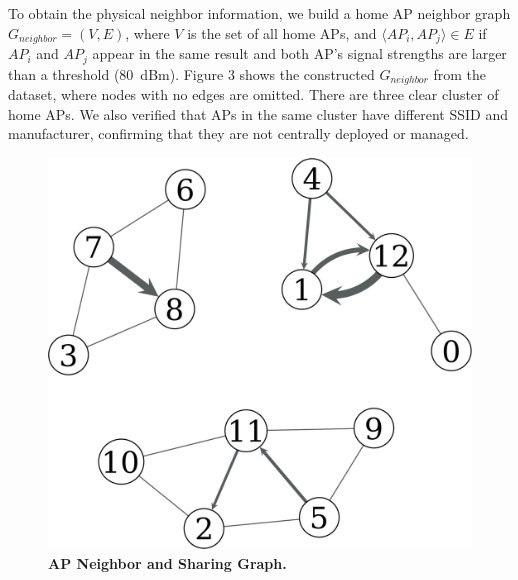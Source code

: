 To obtain the physical neighbor information, we build a home AP neighbor graph
$G_{neighbor}=(V, E)$, where $V$ is the set of all home APs, and $\langle AP_i,
AP_j \rangle \in E$ if $AP_i$ and $AP_j$ appear in the same result and both AP's
signal strengths are larger than a threshold (80~dBm). Figure 3 shows the
constructed $G_{neighbor}$ from the dataset, where nodes with no edges are
omitted. There are three clear cluster of home APs. We also verified that APs in
the same cluster have different SSID and manufacturer, confirming that they are
not centrally deployed or managed.

\begin{figure}[t]
  \centering
  \includegraphics[width=\columnwidth]{./figures/HomeAPNeighborFigure.pdf}
  \caption{\textbf{AP Neighbor and Sharing Graph.}}
  \label{fig:reciprocal}
\end{figure}



\newpage
\clearpage

